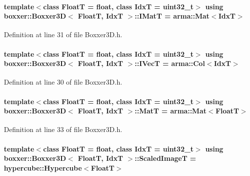 \paragraph[{\texorpdfstring{I\+MatT}{IMatT}}]{\setlength{\rightskip}{0pt plus 5cm}template$<$class FloatT  = float, class IdxT  = uint32\+\_\+t$>$ using {\bf boxxer\+::\+Boxxer3D}$<$ FloatT, IdxT $>$\+::{\bf I\+MatT} =  arma\+::\+Mat$<$IdxT$>$}\hypertarget{classboxxer_1_1Boxxer3D_a9b8cb89e1f1fbf091e5443876ca9a200}{}\label{classboxxer_1_1Boxxer3D_a9b8cb89e1f1fbf091e5443876ca9a200}


Definition at line 31 of file Boxxer3\+D.\+h.

\paragraph[{\texorpdfstring{I\+VecT}{IVecT}}]{\setlength{\rightskip}{0pt plus 5cm}template$<$class FloatT  = float, class IdxT  = uint32\+\_\+t$>$ using {\bf boxxer\+::\+Boxxer3D}$<$ FloatT, IdxT $>$\+::{\bf I\+VecT} =  arma\+::\+Col$<$IdxT$>$}\hypertarget{classboxxer_1_1Boxxer3D_a62a7f35aa283e2a833d13edaa228bca2}{}\label{classboxxer_1_1Boxxer3D_a62a7f35aa283e2a833d13edaa228bca2}


Definition at line 30 of file Boxxer3\+D.\+h.

\paragraph[{\texorpdfstring{MatT}{MatT}}]{\setlength{\rightskip}{0pt plus 5cm}template$<$class FloatT  = float, class IdxT  = uint32\+\_\+t$>$ using {\bf boxxer\+::\+Boxxer3D}$<$ FloatT, IdxT $>$\+::{\bf MatT} =  arma\+::\+Mat$<$FloatT$>$}\hypertarget{classboxxer_1_1Boxxer3D_ae155080a591506ca84d3d70f1cde337d}{}\label{classboxxer_1_1Boxxer3D_ae155080a591506ca84d3d70f1cde337d}


Definition at line 33 of file Boxxer3\+D.\+h.

\paragraph[{\texorpdfstring{Scaled\+ImageT}{ScaledImageT}}]{\setlength{\rightskip}{0pt plus 5cm}template$<$class FloatT  = float, class IdxT  = uint32\+\_\+t$>$ using {\bf boxxer\+::\+Boxxer3D}$<$ FloatT, IdxT $>$\+::{\bf Scaled\+ImageT} =  hypercube\+::\+Hypercube$<$FloatT$>$}\hypertarget{classboxxer_1_1Boxxer3D_aefd3895d7a0790a08de4714ee7a59d97}{}\label{classboxxer_1_1Boxxer3D_aefd3895d7a0790a08de4714ee7a59d97}


